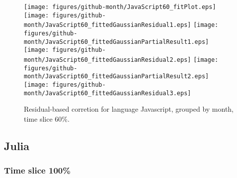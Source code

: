 \begin{figure}[t]
\centering
{}
{\texttt{[image: figures/github-month/JavaScript60\_fitPlot.eps]}}
{\texttt{[image: figures/github-month/JavaScript60\_fittedGaussianResidual1.eps]}}
{\texttt{[image: figures/github-month/JavaScript60\_fittedGaussianPartialResult1.eps]}}
{\texttt{[image: figures/github-month/JavaScript60\_fittedGaussianResidual2.eps]}}
{\texttt{[image: figures/github-month/JavaScript60\_fittedGaussianPartialResult2.eps]}}
{\texttt{[image: figures/github-month/JavaScript60\_fittedGaussianResidual3.eps]}}
\caption{Residual-based corretion for language Javascript, grouped by month, time slice 60\%.}
\end{figure}


\FloatBarrier


\subsection{Julia}

\subsubsection{Time slice 100\%}

